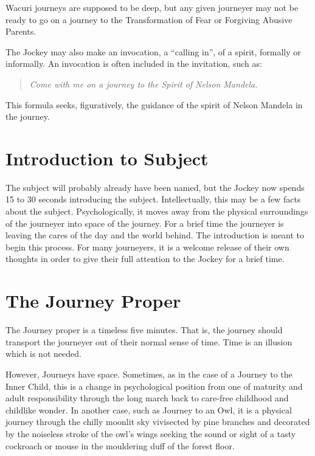 \documentclass[12pt]{book}
\begin{document}
Wacuri journeys are supposed to be deep, but any given journeyer may not be ready to go on a journey to the Transformation of Fear
or Forgiving Abusive Parents.
					
The Jockey may also make an invocation, a “calling in”, of a spirit, formally or informally. An invocation is often included in the invitation, such as:

\begin{quote}{\em 
    Come with me on a journey to the Spirit of Nelson Mandela.}
    \end{quote}
					
This formula seeks, figuratively, the guidance of the spirit of Nelson Mandela in the journey.

\section{Introduction to Subject}
					
The subject will probably already have been named, but the Jockey now spends 15 to 30 seconds introducing the subject. Intellectually, this may be a few facts about the subject. Psychologically, it moves away from the physical surroundings of the journeyer into space of the journey. For a brief time the journeyer is leaving the cares of the day and the world behind. The introduction is meant to begin this process. For many journeyers, it is a welcome release of their own thoughts in order to give their full attention to the Jockey for a brief time.
					
\section{The Journey Proper}
					
The Journey proper is a timeless five minutes. That is, the journey should transport the journeyer out of their normal sense of time. Time is an illusion which is not needed.
					
However, Journeys have space. Sometimes, as in the case of a Journey to the Inner Child,
this is a change in psychological position from one of maturity and adult responsibility through the long march back to care-free childhood and childlike wonder.
In another case, such as Journey to an Owl, it is a physical journey through the chilly moonlit sky vivisected by pine branches and decorated by the noiseless stroke of the owl’s wings seeking the sound or sight of a tasty cockroach or mouse in the mouldering duff of the forest floor.
					
\end{document}
